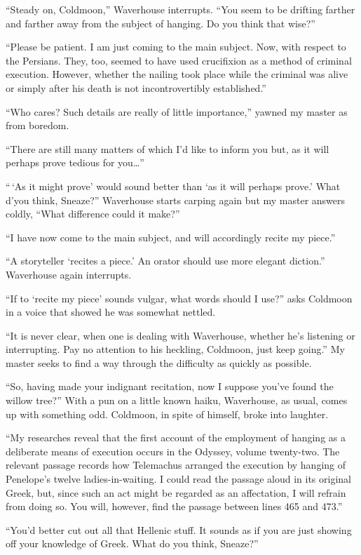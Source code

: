 \documentclass[12pt, openright]{book}
\begin{document}
``Steady on, Coldmoon,'' Waverhouse interrupts. ``You seem to be
drifting farther and farther away from the subject of hanging. Do you
think that wise?''

``Please be patient. I am just coming to the main subject. Now, with
respect to the Persians. They, too, seemed to have used crucifixion as a
method of criminal execution. However, whether the nailing took place
while the criminal was alive or simply after his death is not
incontrovertibly established.''

``Who cares? Such details are really of little importance,'' yawned my
master as from boredom.

``There are still many matters of which I'd like to inform you but, as
it will perhaps prove tedious for you\ldots{}''

``\,`As it might prove' would sound better than `as it will perhaps
prove.' What d'you think, Sneaze?'' Waverhouse starts carping again but
my master answers coldly, ``What difference could it make?''

``I have now come to the main subject, and will accordingly recite my
piece.''

``A storyteller `recites a piece.' An orator should use more elegant
diction.'' Waverhouse again interrupts.

``If to `recite my piece' sounds vulgar, what words should I use?'' asks
Coldmoon in a voice that showed he was somewhat nettled.

``It is never clear, when one is dealing with Waverhouse, whether he's
listening or interrupting. Pay no attention to his heckling, Coldmoon,
just keep going.'' My master seeks to find a way through the difficulty
as quickly as possible.

``So, having made your indignant recitation, now I suppose you've found
the willow tree?'' With a pun on a little known haiku, Waverhouse, as
usual, comes up with something odd. Coldmoon, in spite of himself, broke
into laughter.

``My researches reveal that the first account of the employment of
hanging as a deliberate means of execution occurs in the Odyssey, volume
twenty-two. The relevant passage records how Telemachus arranged the
execution by hanging of Penelope's twelve ladies-in-waiting. I could
read the passage aloud in its original Greek, but, since such an act
might be regarded as an affectation, I will refrain from doing so. You
will, however, find the passage between lines 465 and 473.''

``You'd better cut out all that Hellenic stuff. It sounds as if you are
just showing off your knowledge of Greek. What do you think, Sneaze?''
\end{document}
